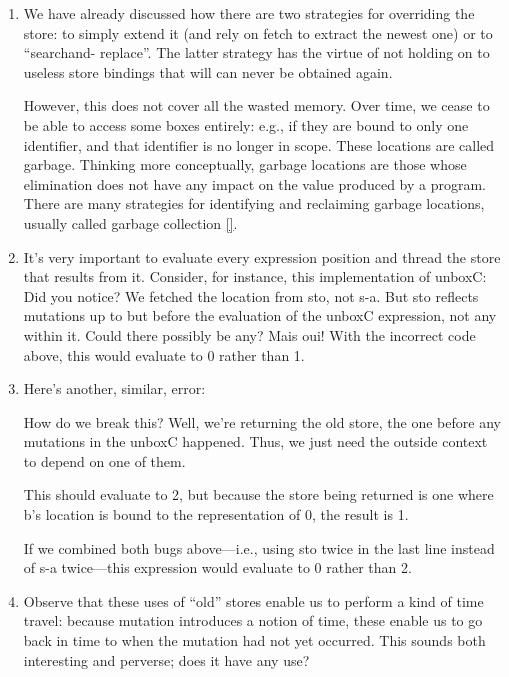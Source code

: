 \begin{enumerate}
  \item
We have already discussed how there are two strategies for overriding the store:
to simply extend it (and rely on fetch to extract the newest one) or to
“searchand- replace”. The latter strategy has the virtue of not holding on to
useless store bindings that will can never be obtained again.

However, this does not cover all the wasted memory. Over time, we cease to be
able to access some boxes entirely: e.g., if they are bound to only one
identifier, and that identifier is no longer in scope. These locations are
called garbage. Thinking more conceptually, garbage locations are those whose
elimination does not have any impact on the value produced by a program. There
are many strategies for identifying and reclaiming garbage locations, usually
called garbage collection \ref{}.
  
  \item
It’s very important to evaluate every expression position and thread the store
that results from it. Consider, for instance, this implementation of unboxC:
Did you notice? We fetched the location from sto, not s-a. But sto reflects
mutations up to but before the evaluation of the unboxC expression, not any
within it. Could there possibly be any? Mais oui!
With the incorrect code above, this would evaluate to 0 rather than 1.

  \item
Here’s another, similar, error:

How do we break this? Well, we’re returning the old store, the one before any
mutations in the unboxC happened. Thus, we just need the outside context to
depend on one of them.

This should evaluate to 2, but because the store being returned is one where b’s
location is bound to the representation of 0, the result is 1.

If we combined both bugs above—i.e., using sto twice in the last line instead of
s-a twice—this expression would evaluate to 0 rather than 2.


  \item
Observe that these uses of “old” stores enable us to perform a kind of time
travel: because mutation introduces a notion of time, these enable us to go back
in time to when the mutation had not yet occurred. This sounds both interesting and
perverse; does it have any use?


\end{enumerate}
